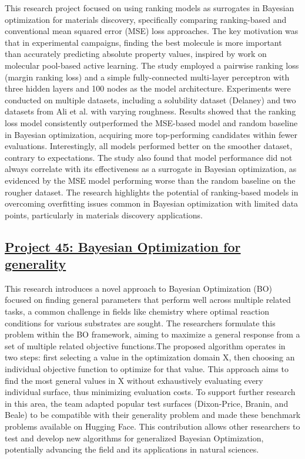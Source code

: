 This research project focused on using ranking models as surrogates in Bayesian optimization for materials discovery, specifically comparing ranking-based and conventional mean squared error (MSE) loss approaches. The key motivation was that in experimental campaigns, finding the best molecule is more important than accurately predicting absolute property values, inspired by work on molecular pool-based active learning\cite{graff_accelerating_2021}. The study employed a pairwise ranking loss (margin ranking loss) and a simple fully-connected multi-layer perceptron with three hidden layers and 100 nodes as the model architecture. Experiments were conducted on multiple datasets, including a solubility dataset (Delaney) and two datasets from Ali et al. with varying roughness\cite{aldeghi_roughness_2022}. Results showed that the ranking loss model consistently outperformed the MSE-based model and random baseline in Bayesian optimization, acquiring more top-performing candidates within fewer evaluations. Interestingly, all models performed better on the smoother dataset, contrary to expectations. The study also found that model performance did not always correlate with its effectiveness as a surrogate in Bayesian optimization, as evidenced by the MSE model performing worse than the random baseline on the rougher dataset. The research highlights the potential of ranking-based models in overcoming overfitting issues common in Bayesian optimization with limited data points, particularly in materials discovery applications.
 \subsection*{\href{https://www.youtube.com/watch?v=wfSyIudptfc}{Project 45: Bayesian Optimization for generality}}

This research introduces a novel approach to Bayesian Optimization (BO) focused on finding general parameters that perform well across multiple related tasks, a common challenge in fields like chemistry where optimal reaction conditions for various substrates are sought. The researchers formulate this problem within the BO framework, aiming to maximize a general response from a set of multiple related objective functions.The proposed algorithm operates in two steps: first selecting a value in the optimization domain X, then choosing an individual objective function to optimize for that value. This approach aims to find the most general values in X without exhaustively evaluating every individual surface, thus minimizing evaluation costs. To support further research in this area, the team adapted popular test surfaces (Dixon-Price, Branin, and Beale) to be compatible with their generality problem and made these benchmark problems available on Hugging Face. This contribution allows other researchers to test and develop new algorithms for generalized Bayesian Optimization, potentially advancing the field and its applications in natural sciences.
